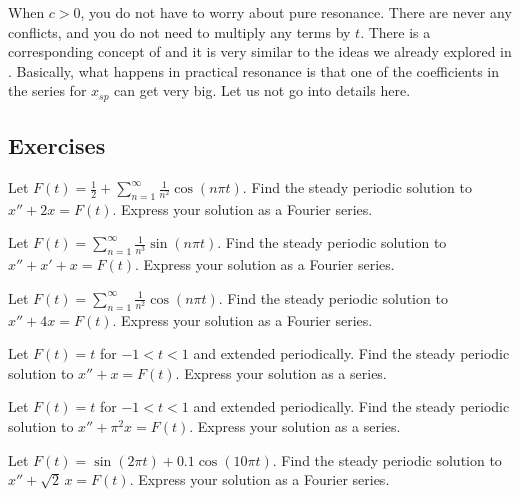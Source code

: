 When $c > 0$, you do not have to worry about pure resonance.
There are never any conflicts, and you do not need to multiply any
terms by $t$.  There is a corresponding concept of
and it is very similar to the ideas we already explored in
.
Basically, what happens in practical resonance is that one of the
coefficients in the series for $x_{sp}$ can get very big.  Let us not go
into details here.

\subsection{Exercises}

\begin{exercise}
Let $F(t) = \frac{1}{2} + \sum_{n=1}^\infty \frac{1}{n^2} \cos (n \pi t)$.
Find
the steady periodic solution to
$x'' + 2 x = F(t)$.  Express your solution as a Fourier series.
\end{exercise}

\begin{exercise}
Let $F(t) = \sum_{n=1}^\infty \frac{1}{n^3} \sin (n \pi t)$.  Find
the steady periodic solution to
$x'' + x' + x = F(t)$.  Express your solution as a Fourier series.
\end{exercise}

\begin{exercise}
Let $F(t) = \sum_{n=1}^\infty \frac{1}{n^2} \cos (n \pi t)$.  Find
the steady periodic solution to
$x'' + 4 x = F(t)$.  Express your solution as a Fourier series.
\end{exercise}

\begin{exercise}
Let $F(t) = t$ for $-1 < t < 1$ and extended periodically.
Find the steady periodic solution to
$x'' + x = F(t)$.  Express your solution as a series.
\end{exercise}

\begin{exercise}
Let $F(t) = t$ for $-1 < t < 1$ and extended periodically.
Find the steady periodic solution to
$x'' + \pi^2 x = F(t)$.  Express your solution as a series.
\end{exercise}

\setcounter{exercise}{100}

\begin{exercise}
Let $F(t) = \sin(2\pi t) + 0.1 \cos(10 \pi t)$.
Find the steady periodic solution to $x'' + \sqrt{2}\, x = F(t)$.
Express your solution as a Fourier series.
\end{exercise}

